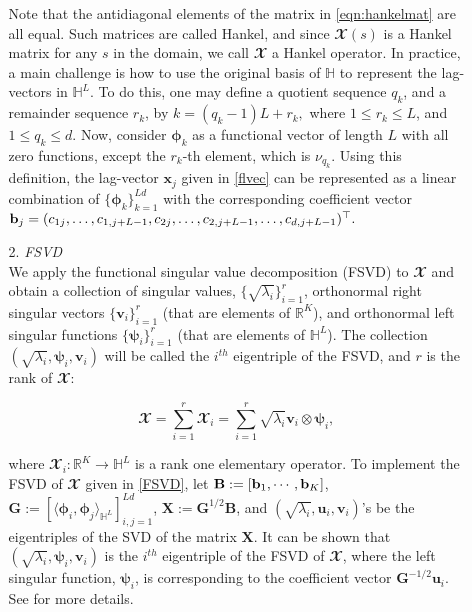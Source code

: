 \begin{itemize}
\begin{itemize}
Note that the antidiagonal elements of the matrix in \eqref{eqn:hankelmat} are all equal. Such matrices are called Hankel, and since $\mathbfcal{X}(s)$ is a Hankel matrix for any $s$ in the domain, we call $\mathbfcal{X}$ a Hankel operator. In practice, a main challenge is how to use the original basis of $\mathbb{H}$ to represent the lag-vectors in $\mathbb{H}^L$. To do this, one may define a quotient sequence $q_k$, and a remainder sequence $r_k$, by $k=(q_k-1)L+r_k,$ where $1\leq r_k\leq L$, and $1\leq q_k\leq d$. Now, consider ${\pmb \phi}_{k}$ as a functional vector of length $L$ with all zero functions, except the $r_k$-th element, which is $\nu_{q_k}$. Using this definition, the lag-vector ${\pmb{x}_j}$ given in \eqref{flvec} can be represented as a linear combination of $\{{\pmb \phi}_{k}\}_{k=1}^{Ld}$ with the corresponding coefficient vector ${\bf b}_j=(c_{1j},\ldots, c_{1,j+L-1},c_{2j},\ldots,c_{2,j+L-1},\ldots,c_{d,j+L-1} )^\top.$ 

\item[2.] \textit{FSVD }\\ We apply the functional singular value decomposition (FSVD) to $\mathbfcal{X}$ and obtain a collection of singular values, $\{\sqrt{\lambda_i}\}_{i=1}^{r}$, orthonormal right singular vectors $\{\mathbf{v}_{i}\}_{i=1}^{r}$ (that are elements of $\mathbb{R}^{K}$), and orthonormal left singular functions $\{\pmb{\psi}_{i}\}_{i=1}^{r}$ (that are elements of $\mathbb{H}^{L}$). The collection $(\sqrt{\lambda_i}, \pmb{\psi}_i, \mathbf{v}_i)$ will be called the $i^{th}$ eigentriple of the FSVD, and $r$ is the rank of $\mathbfcal{X}$:	

	\begin{equation}\label{FSVD}

		\mathbfcal{X} = \sum_{i=1}^{r} \mathbfcal{X}_{i} = \sum_{i=1}^{r} \sqrt{\lambda_i} \mathbf{v}_{i} \otimes \pmb{\psi}_{i},

	\end{equation}

where $\mathbfcal{X}_{i}:\mathbb{R}^{K} \rightarrow \mathbb{H}^{L}$ is a rank one elementary operator. To implement the FSVD of $\mathbfcal{X}$ given in \eqref{FSVD}, let ${\bf B}:=[{\bf b}_1,\cdots,{\bf b}_K]$, $\mathbf{G}:=[ \langle {\pmb \phi}_{i}, {\pmb \phi}_{j} \rangle_{\mathbb{H}^L}]_{i,j=1}^{Ld}$, $\mathbf{X}:=\mathbf{G}^{1/2}\mathbf{B}$, and $\left(\sqrt{\lambda_i}, \pmb{u}_i, \mathbf{v}_i\right)$'s be the eigentriples of the SVD of the matrix $\mathbf{X}$. It can be shown that $\left(\sqrt{\lambda_i},\pmb{\psi}_i,\mathbf{v}_i \right)$ is the $i^{th}$ eigentriple of the FSVD of $\mathbfcal{X}$, where the left singular function, ${\pmb \psi}_i$, is corresponding to the coefficient vector $\mathbf{G}^{-1/2}{\pmb u}_i$. See \citep{haghbin2021} for more details.


\end{itemize}
\end{itemize}
